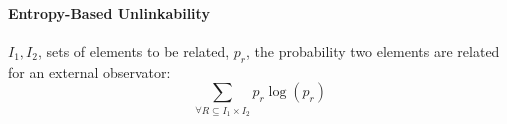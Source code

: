 \documentclass[6pt]{scrartcl}
\begin{document}
\begin{multicols}{4}
\paragraph{Entropy-Based Unlinkability}
$I_1,I_2$, sets of elements to be related, $p_r$, the probability two elements are related for an external observator:
\begin{equation*}
	\sum_{\forall R \subseteq I_1 \times I_2}p_r \log(p_r)
\end{equation*}

\end{multicols}
\end{document}
